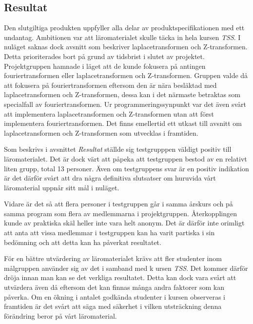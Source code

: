 \documentclass[]{article}
\begin{document}
\subsection{Resultat}

Den slutgiltiga produkten uppfyller alla delar av produktspecifikationen med ett undantag. Ambitionen var att
läromaterialet skulle täcka in hela kursen \textit{TSS}. I nuläget saknas dock avsnitt som beskriver laplacetransformen
och Z-transformen. Detta prioriterades bort på grund av tidsbrist i slutet av projektet. Projektgruppen hamnade i läget
att de kunde fokusera på antingen fouriertransformen eller laplacetransformen och Z-transformen. Gruppen valde då att
fokusera på fouriertransformen eftersom den är nära besläktad med laplacetransformen och Z-transformen, dessa kan i det
närmaste betraktas som specialfall av fouriertransformen. Ur programmeringssynpunkt var det även svårt att implementera
laplacetransformen och Z-transformen utan att först implementera fouriertransformen. Det finns emellertid ett utkast
till avsnitt om laplacetransformen och Z-transformen som utvecklas i framtiden.

Som beskrivs i avsnittet \textit{Resultat} ställde sig testgrupppen väldigt positiv till läromaterialet.
Det är dock värt att påpeka att testgruppen bestod av en relativt liten grupp, total 13 personer.
Även om testgruppens svar är en positiv indikation är det därför svårt att dra några definitiva slutsatser om huruvida
vårt läromaterial uppnår sitt mål i nuläget.

Vidare är det så att flera personer i testgruppen går i samma årskurs och på samma program som flera av medlemmarna i
projektgruppen. Återkopplingen kunde av praktiska skäl heller inte vara helt anonym. Det är därför inte orimligt att
anta att vissa medlemmar i testgruppen kan ha varit partiska i sin bedömning och att detta kan ha påverkat resultatet.

För en bättre utvärdering av läromaterialet krävs att fler studenter inom målgruppen använder sig av det i samband med k
ursen \textit{TSS}. Det kommer därför dröja innan man kan se det verkliga resultatet. Detta kan dock vara svårt att
utvärdera även då eftersom det kan finnas många andra faktorer som kan påverka. Om en ökning i antalet godkända
studenter i kursen observeras i framtiden är det svårt att säga med säkerhet i vilken utsträckning denna förändring
beror på vårt läromaterial.

\end{document}
